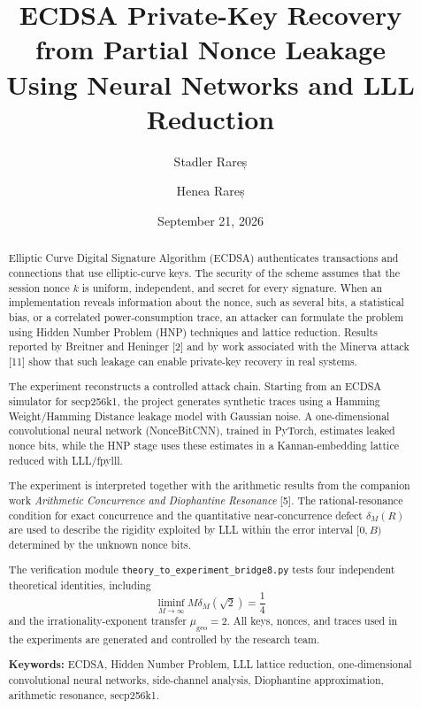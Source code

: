 \documentclass[11pt,a4paper]{article}
\title{\textbf{ECDSA Private-Key Recovery from Partial Nonce Leakage}\\
\large Using Neural Networks and LLL Reduction}
\author{Stadler Rareș \and Henea Rareș}
\date{September 21, 2026}
\begin{document}
\maketitle

\begin{abstract}
Elliptic Curve Digital Signature Algorithm (ECDSA) authenticates transactions and connections that use elliptic-curve keys. The security of the scheme assumes that the session nonce $k$ is uniform, independent, and secret for every signature. When an implementation reveals information about the nonce, such as several bits, a statistical bias, or a correlated power-consumption trace, an attacker can formulate the problem using Hidden Number Problem (HNP) techniques and lattice reduction. Results reported by Breitner and Heninger [2] and by work associated with the Minerva attack [11] show that such leakage can enable private-key recovery in real systems.

The experiment reconstructs a controlled attack chain. Starting from an ECDSA simulator for secp256k1, the project generates synthetic traces using a Hamming Weight/Hamming Distance leakage model with Gaussian noise. A one-dimensional convolutional neural network (NonceBitCNN), trained in PyTorch, estimates leaked nonce bits, while the HNP stage uses these estimates in a Kannan-embedding lattice reduced with LLL/fpylll.

The experiment is interpreted together with the arithmetic results from the companion work \emph{Arithmetic Concurrence and Diophantine Resonance} [5]. The rational-resonance condition for exact concurrence and the quantitative near-concurrence defect $\delta_M(R)$ are used to describe the rigidity exploited by LLL within the error interval $[0,B)$ determined by the unknown nonce bits.

The verification module \texttt{theory\_to\_experiment\_bridge8.py} tests four independent theoretical identities, including
\[
\liminf_{M\to\infty} M\delta_M(\sqrt{2})=\frac14
\]
and the irrationality-exponent transfer $\mu_{\mathrm{geo}}=2$. All keys, nonces, and traces used in the experiments are generated and controlled by the research team.

\textbf{Keywords:} ECDSA, Hidden Number Problem, LLL lattice reduction, one-dimensional convolutional neural networks, side-channel analysis, Diophantine approximation, arithmetic resonance, secp256k1.
\end{abstract}

\clearpage
\tableofcontents
\clearpage
\end{document}
